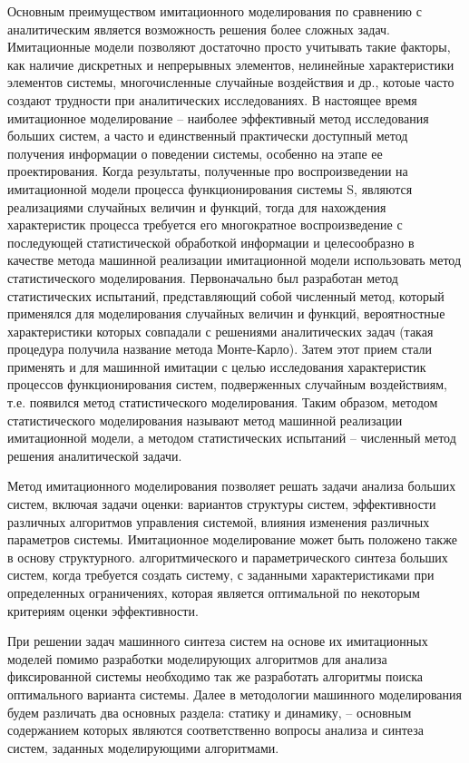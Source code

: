     Основным преимуществом имитационного моделирования по сравнению с аналитическим является возможность решения более сложных задач. Имитационные модели позволяют достаточно просто учитывать такие факторы, как наличие дискретных и непрерывных элементов, нелинейные характеристики элементов системы, многочисленные случайные воздействия и др., котоые часто создают трудности при аналитических исследованиях. В настоящее время имитационное моделирование -- наиболее эффективный метод исследования больших систем, а часто и единственный практически доступный метод получения информации о поведении системы, особенно на этапе ее проектирования.
    Когда результаты, полученные про воспроизведении на имитационной модели процесса функционирования системы S, являются реализациями случайных величин и функций, тогда для нахождения характеристик процесса требуется его многократное воспроизведение с последующей статистической обработкой информации и целесообразно в качестве метода машинной реализации имитационной модели использовать метод статистического моделирования. Первоначально был разработан метод статистических испытаний, представляющий собой численный метод, который применялся для моделирования случайных величин и функций, вероятностные характеристики которых совпадали с решениями аналитических задач (такая процедура получила название метода Монте-Карло). Затем этот прием стали применять и для машинной имитации с целью исследования характеристик процессов функционирования систем, подверженных случайным воздействиям, т.е. появился метод статистического моделирования. Таким образом, методом статистического моделирования называют метод машинной реализации имитационной модели, а методом статистических испытаний -- численный метод решения аналитической задачи.

    Метод имитационного моделирования позволяет решать задачи анализа больших систем, включая задачи оценки: вариантов структуры систем, эффективности различных алгоритмов управления системой, влияния изменения различных параметров системы. Имитационное моделирование может быть положено также в основу структурного. алгоритмического и параметрического синтеза больших систем, когда требуется создать систему, с заданными характеристиками при определенных ограничениях, которая является оптимальной по некоторым критериям оценки эффективности.

    При решении задач машинного синтеза систем на основе их имитационных моделей помимо разработки моделирующих алгоритмов для анализа фиксированной системы необходимо так же разработать алгоритмы поиска оптимального варианта системы. Далее в методологии машинного моделирования будем различать два основных раздела: статику и динамику, -- основным содержанием которых являются соответственно вопросы анализа и синтеза систем, заданных моделирующими алгоритмами.

